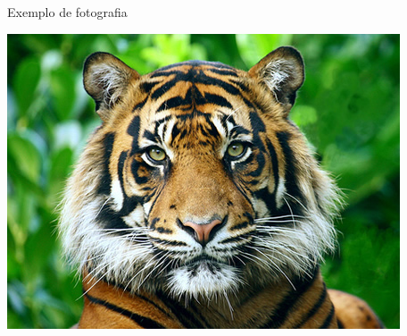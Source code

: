 \begin{fotografia}[htb]
	\caption{Exemplo de fotografia}
	\label{fot:grafico3}
 	\includegraphics[width=\textwidth]{figuras/fotografia}
\end{fotografia}

